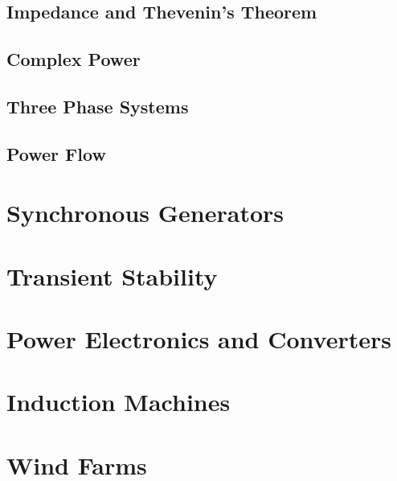 \documentclass[14pt,a5paper,twoside]{book}
\begin{document}
\section{Impedance and Thevenin's Theorem}

\newpage
\section{Complex Power}

\section{Three Phase Systems}

\section{Power Flow}

\chapter{Synchronous Generators}

\chapter{Transient Stability}

\chapter{Power Electronics and Converters}

\chapter{Induction Machines}

\chapter{Wind Farms}
\end{document}
